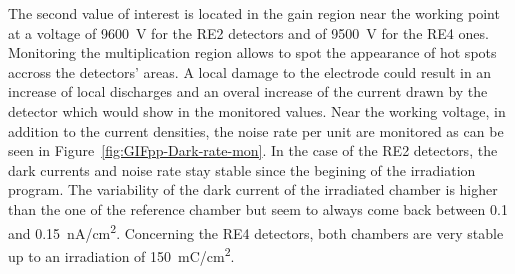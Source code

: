 	The second value of interest is located in the gain region near the working point at a voltage of \SI{9600}{V} for the RE2 detectors and of \SI{9500}{V} for the RE4 ones. Monitoring the multiplication region allows to spot the appearance of hot spots accross the detectors' areas. A local damage to the electrode could result in an increase of local discharges and an overal increase of the current drawn by the detector which would show in the monitored values. Near the working voltage, in addition to the current densities, the noise rate per unit are monitored as can be seen in Figure~\ref{fig:GIFpp-Dark-rate-mon}. In the case of the RE2 detectors, the dark currents and noise rate stay stable since the begining of the irradiation program. The variability of the dark current of the irradiated chamber is higher than the one of the reference chamber but seem to always come back between 0.1 and \SI{0.15}{nA/cm^2}. Concerning the RE4 detectors, both chambers are very stable up to an irradiation of \SI{150}{mC/cm^2}.

